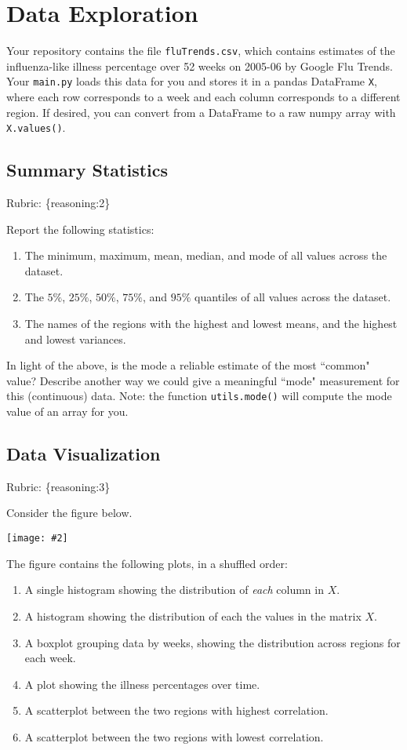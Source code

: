 \documentclass{article}
\def\rubric#1{\gre{Rubric: \{#1\}}}{}
\def\blu#1{{\color{blu}#1}}
\def\gre#1{{\color{gre}#1}}
\newcommand{\fig}[2]{\texttt{[image: \#2]}}
\def\enum#1{\begin{enumerate}#1\end{enumerate}}
\begin{document}
\section{Data Exploration}


Your repository contains the file \texttt{fluTrends.csv}, which contains estimates
of the influenza-like illness percentage over 52 weeks on 2005-06 by Google Flu Trends.
Your \texttt{main.py} loads this data for you and stores it in a pandas DataFrame \texttt{X},
where each row corresponds to a week and each column
corresponds to a different
region. If desired, you can convert from a DataFrame to a raw numpy array with \texttt{X.values()}.

\subsection{Summary Statistics}
\rubric{reasoning:2}

\blu{Report the following statistics}:
\enum{
\item The minimum, maximum, mean, median, and mode of all values across the dataset.
\item The $5\%$, $25\%$, $50\%$, $75\%$, and $95\%$ quantiles of all values across the dataset.
\item The names of the regions with the highest and lowest means, and the highest and lowest variances.
}
In light of the above, \blu{is the mode a reliable estimate of the most ``common" value? Describe another way we could give a meaningful ``mode" measurement for this (continuous) data.} Note: the function \texttt{utils.mode()} will compute the mode value of an array for you.



\subsection{Data Visualization}
\rubric{reasoning:3}

Consider the figure below.

\fig{1}{../figs/visualize-unlabeled}

The figure contains the following plots, in a shuffled order:
\enum{
\item A single histogram showing the distribution of \emph{each} column in $X$.
\item A histogram showing the distribution of each the values in the matrix $X$.
\item A boxplot grouping data by weeks, showing the distribution across regions for each week.
\item A plot showing the illness percentages over time.
\item A scatterplot between the two regions with highest correlation.
\item A scatterplot between the two regions with lowest correlation.
}
\end{document}
